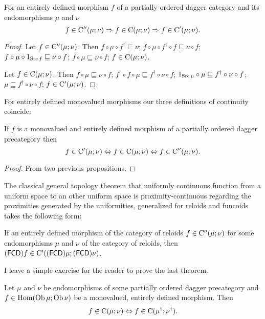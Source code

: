 \begin{prop}
For an entirely defined morphism $f$ of a partially ordered dagger
category and its endomorphisms $\mu$ and $\nu$
\[
f\in\mathrm{C}''(\mu;\nu)\Rightarrow f\in\mathrm{C}(\mu;\nu)\Rightarrow f\in\mathrm{C}'(\mu;\nu).
\]
\end{prop}
\begin{proof}
Let $f\in\mathrm{C}''(\mu;\nu)$. Then $f\circ\mu\circ f^{\dagger}\sqsubseteq\nu$;
$f\circ\mu\circ f^{\dagger}\circ f\sqsubseteq\nu\circ f$; $f\circ\mu\circ1_{\operatorname{Src} f}\sqsubseteq\nu\circ f$;
$f\circ\mu\sqsubseteq\nu\circ f$; $f\in\mathrm{C}(\mu;\nu)$.

Let $f\in\mathrm{C}(\mu;\nu)$. Then $f\circ\mu\sqsubseteq\nu\circ f$;
$f^{\dagger}\circ f\circ\mu\sqsubseteq f^{\dagger}\circ\nu\circ f$;
$1_{\operatorname{Src}\mu}\circ\mu\sqsubseteq f^{\dagger}\circ\nu\circ f$; $\mu\sqsubseteq f^{\dagger}\circ\nu\circ f$;
$f\in\mathrm{C}'(\mu;\nu)$.
\end{proof}
For entirely defined monovalued morphisms our three definitions of
continuity coincide:
\begin{thm}\label{cont-eq}
If $f$ is a monovalued and entirely defined morphism of a partially
ordered dagger precategory then
\[
f\in\mathrm{C}'(\mu;\nu)\Leftrightarrow f\in\mathrm{C}(\mu;\nu)\Leftrightarrow f\in\mathrm{C}''(\mu;\nu).
\]
\end{thm}
\begin{proof}
From two previous propositions.
\end{proof}
The classical general topology theorem that uniformly continuous function
from a uniform space to an other uniform space is proximity-continuous
regarding the proximities generated by the uniformities, generalized
for reloids and funcoids takes the following form:
\begin{thm}
If an entirely defined morphism of the category of reloids $f\in\mathrm{C}''(\mu;\nu)$
for some endomorphisms $\mu$ and $\nu$ of the category of reloids,
then $\mathsf{(\mathsf{FCD})}f\in\mathrm{C}'((\mathsf{FCD})\mu;(\mathsf{FCD})\nu)$.\end{thm}
\begin{xca}
I leave a simple exercise for the reader to prove the last theorem.
\end{xca}

\begin{thm}
Let $\mu$ and $\nu$ be endomorphisms of some partially ordered dagger precategory and
$f\in\operatorname{Hom}(\operatorname{Ob}\mu;\operatorname{Ob}\nu)$ be a monovalued, entirely defined morphism. Then
\[ f\in\mathrm{C}(\mu;\nu)\Leftrightarrow f\in\mathrm{C}(\mu^{\dagger};\nu^{\dagger}). \]
\end{thm}

